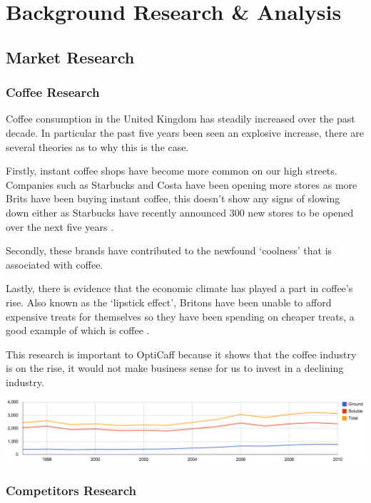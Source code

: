 \section{Background Research \& Analysis}

\subsection{Market Research}

\subsubsection{Coffee Research}
Coffee consumption in the United Kingdom has steadily increased over the past decade. In particular the past five years been seen an explosive increase, there are several theories as to why this is the case.

Firstly, instant coffee shops have become more common on our high streets. Companies such as Starbucks and Costa have been opening more stores as more Brits have been buying instant coffee, this doesn’t show any signs of slowing down either as Starbucks have recently announced 300 new stores to be opened over the next five years \cite{starbucks}.

Secondly, these brands have contributed to the newfound ‘coolness’ that is associated with coffee. 

Lastly, there is evidence that the economic climate has played a part in coffee’s rise. Also known as the ‘lipstick effect’, Britons have been unable to afford expensive treats for themselves so they have been spending on cheaper treats, a good example of which is coffee \cite{costa}.

This research is important to OptiCaff because it shows that the coffee industry is on the rise, it would not make business sense for us to invest in a declining industry.

\begin{center}
\includegraphics[trim = 0mm 0mm 0mm 0mm, clip, scale=0.4]{images/CaffeineGraph.png}
\end{center}

\subsubsection{Competitors Research}
\label{sec:competitors}
